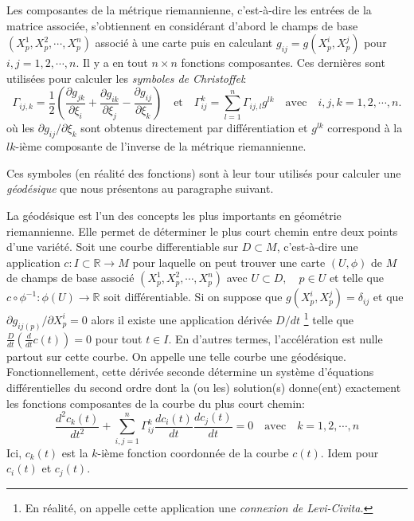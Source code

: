 \documentclass[11pt, letterpaper]{article}
\begin{document}
	Les composantes de la métrique riemannienne, c'est-à-dire les entrées de la matrice associée, s'obtiennent en considérant d'abord le champs de base $(X_p^1, X_p^2, \cdots, X_p^n)$ associé à une carte puis en calculant $g_{ij}=g(X_p^i, X_p^j)$ pour $i,j=1,2,\cdots, n.$ Il y a en tout $n\times  n$ fonctions composantes. Ces dernières sont utilisées pour calculer les \textit{symboles de Christoffel}:
	\begin{equation}\label{christoffel_symbs}
	    \Gamma_{ij,k}=\frac{1}{2}\left(\frac{\partial g_{jk}}{\partial\xi_{i}}+\frac{\partial g_{ik}}{\partial\xi_{j}}-\frac{\partial g_{ij}}{\partial\xi_{k}}\right) \quad\text{et}\quad \Gamma_{ij}^k=\sum_{l=1}^n\Gamma_{ij, l}g^{lk} \quad\text{avec}\quad i,j,k=1,2, \cdots, n.
	\end{equation}
	où les $ \partial g_{ij}/\partial\xi_k$ sont obtenus directement par différentiation et $g^{lk}$ correspond à la $lk$-ième composante de l'inverse de la métrique riemannienne.
	
	Ces symboles (en réalité des fonctions) sont à leur tour utilisés pour calculer une \textit{géodésique} que nous présentons au paragraphe suivant.
	\newline
	
	La géodésique est l'un des concepts les plus importants en géométrie riemannienne. Elle permet de déterminer le plus court chemin entre deux points d'une variété. Soit une courbe differentiable sur $D\subset M$, c'est-à-dire une application $c\colon I\subset\mathbb{R}\longrightarrow M$ pour laquelle on peut trouver une carte $(U, \phi)$ de $M$ de champs de base associé  $(X_p^1, X_p^2, \cdots, X_p^n)$ avec $U\subset D,\quad p\in U$ et telle que $c\circ\phi^{-1}\colon\phi(U)\longrightarrow\mathbb{R}$ soit différentiable. 
	Si on suppose que $g(X_p^i, X_p^j)=\delta_{ij}$ et que $\partial g_{ij(p)}/\partial X_p^i=0$ alors il existe une application dérivée $D/dt$ \footnote{En réalité, on appelle cette application une \textit{connexion de Levi-Civita.}} telle que $\frac{D}{dt}\left(\frac{d}{dt}c(t)\right)=0$ pour tout $t\in I$. En d'autres termes, l'accélération est nulle partout sur cette courbe. On appelle une telle courbe une géodésique. Fonctionnellement, cette dérivée seconde détermine un système d'équations différentielles du second ordre dont la (ou les) solution(s) donne(ent) exactement les fonctions composantes de la courbe du plus court chemin:\\
	\begin{equation}\label{geodesics_equn}
	    \frac{d^2c_k(t)}{dt^2}+ \sum_{i,j=1}^n \Gamma_{ij}^k\frac{dc_i(t)}{dt}\frac{dc_j(t)}{dt}=0\quad \text{avec}\quad k=1, 2, \cdots, n
	\end{equation}
	Ici, $c_k(t)$ est la $k$-ième fonction coordonnée de la courbe $c(t)$. Idem pour $c_i(t)$ et $c_j(t)$.\\
	
\end{document}
